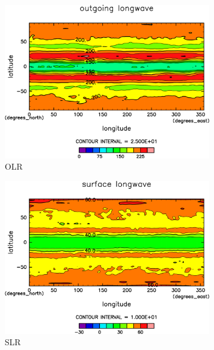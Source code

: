 \documentclass[body]{subfiles}
\begin{document}
\begin{figure}[t]
	\centering
	\begin{subfigure}{.4\textwidth}
		\centering
		\includegraphics[width=\columnwidth]{S1366/OLR,time=14600:14965-crop-rotate.pdf}
		\caption{OLR \hmu*{[W/m^{-2}]}}\label{S1366OLR}
	\end{subfigure}
	\begin{subfigure}{.4\textwidth}
		\centering
		\includegraphics[width=\columnwidth]{S1366/SLR,time=14600:14965-crop-rotate.pdf}
		\caption{SLR\hmu*{[W/m^{-2}]}}\label{S1366SLR}
	\end{subfigure}
	\begin{subfigure}{.4\textwidth}
		\centering

\end{subfigure}
\end{figure}
\end{document}
